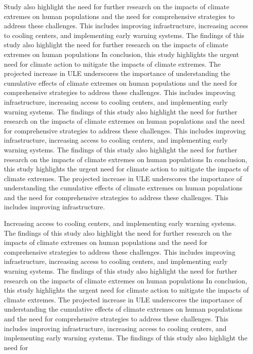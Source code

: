 \documentclass[9pt, twoside, twocolumn]{extarticle}
\begin{document}
Study also highlight the need for further research on the impacts of climate extremes on human populations and the need for comprehensive strategies to address these challenges. This includes improving infrastructure, increasing access to cooling centers, and implementing early warning systems.\cite{IPCC2021} The findings of this study also highlight the need for further research on the impacts of climate extremes on human populations  In conclusion, this study highlights the urgent need for climate action to mitigate the impacts of climate extremes. The projected increase in ULE underscores the importance of understanding the cumulative effects of climate extremes on human populations and the need for comprehensive strategies to address these challenges. This includes improving infrastructure, increasing access to cooling centers, and implementing early warning systems.\cite{IPCC2021} The findings of this study also highlight the need for further research on the impacts of climate extremes on human populations and the need for comprehensive strategies to address these challenges. This includes improving infrastructure, increasing access to cooling centers, and implementing early warning systems.\cite{IPCC2021} The findings of this study also highlight the need for further research on the impacts of climate extremes on human populations  In conclusion, this study highlights the urgent need for climate action to mitigate the impacts of climate extremes. The projected increase in ULE underscores the importance of understanding the cumulative effects of climate extremes on human populations and the need for comprehensive strategies to address these challenges. This includes improving infrastructure.

Increasing access to cooling centers, and implementing early warning systems.\cite{IPCC2021} The findings of this study also highlight the need for further research on the impacts of climate extremes on human populations and the need for comprehensive strategies to address these challenges. This includes improving infrastructure, increasing access to cooling centers, and implementing early warning systems.\cite{IPCC2021} The findings of this study also highlight the need for further research on the impacts of climate extremes on human populations  In conclusion, this study highlights the urgent need for climate action to mitigate the impacts of climate extremes. The projected increase in ULE underscores the importance of understanding the cumulative effects of climate extremes on human populations and the need for comprehensive strategies to address these challenges. This includes improving infrastructure, increasing access to cooling centers, and implementing early warning systems.\cite{IPCC2021} The findings of this study also highlight the need for
\end{document}
